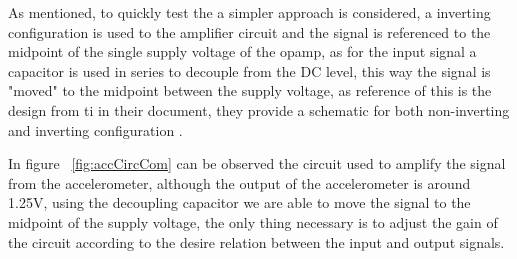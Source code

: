 As mentioned, to quickly test the a simpler approach is considered, a inverting configuration is used to the amplifier circuit and the signal is referenced to the midpoint of the single supply voltage of the \acrshort{opamp}, as for the input signal a capacitor is used in series to decouple from the DC level, this way the signal is "moved" to the midpoint between the supply voltage, as reference of this is the design from \acrshort{ti} in their document, they provide a schematic for both non-inverting and inverting configuration \cite{ACCoupledSingle2015}.

In figure ~\ref{fig:accCircCom} can be observed the circuit used to amplify the signal from the accelerometer, although the output of the accelerometer is around 1.25V, using the decoupling capacitor we are able to move the signal to the midpoint of the supply voltage, the only thing necessary is to adjust the gain of the circuit according to the desire relation between the input and output signals.
